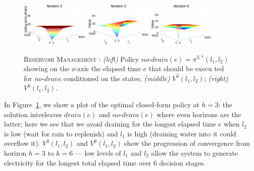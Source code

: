 \documentclass[twoside,11pt]{article}
\newcommand{\WaterReservoir}{\textsc{Reservoir Management }}
\begin{document}
\begin{figure}[tbp!]
\vspace{-2mm}
\centering
\includegraphics[width=0.29\textwidth]{Figures2/camdp/q3.pdf}
\includegraphics[width=0.29\textwidth]{Figures2/camdp/v3.pdf}
\includegraphics[width=0.29\textwidth]{Figures2/camdp/v6.pdf}
\vspace{-3mm}
\caption{%
\WaterReservoir: 
{\it (left)} Policy $\mathit{no}$-$\mathit{drain}(e)=\pi^{3,*}(l_1,l_2)$ 
showing on the z-axis the elapsed time $e$ that should be execu                                          ted 
for $\mathit{no}$-$\mathit{drain}$ conditioned on the states; 
{\it (middle)} $V^3(l_1,l_2)$; 
{\it (right)} $V^6(l_1,l_2)$.
}
\label{fig:v2plots}
\end{figure}

In Figure~\ref{fig:v2plots}, we show a plot of 
the optimal closed-form policy at $h=3$: the solution interleaves $\mathit{drain}(e)$ and $\mathit{no}$-$\mathit{drain}(e)$ where even horizons are the latter;
here we see that we avoid draining for the longest elapsed time $e$ 
when $l_2$ is low (wait for rain to replenish) and $l_1$ is high (draining
water into it could overflow it).  $V^3(l_1,l_2)$ and $V^6(l_1,l_2)$
show the progression of convergence from horizon $h=3$ to $h=6$ ---
low levels of $l_1$ and $l_2$ allow the system to generate electricity
for the longest total elapsed time over 6 decision stages. 
\end{document}
